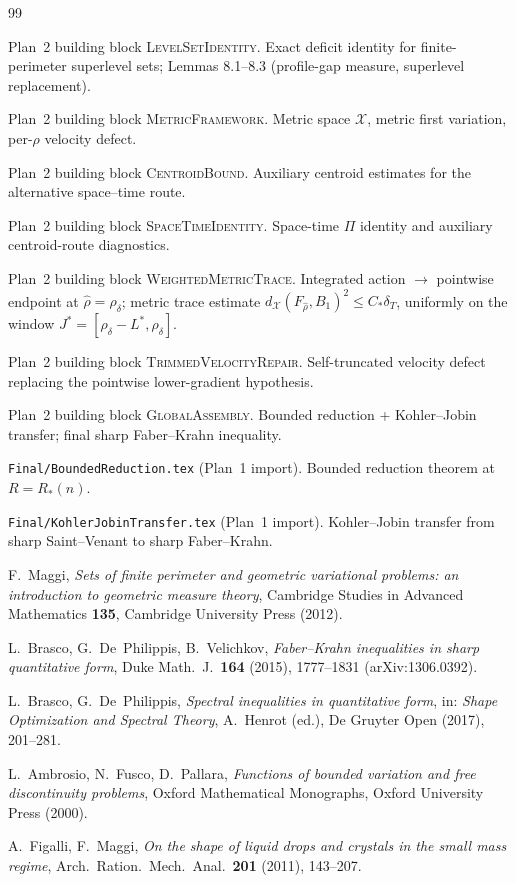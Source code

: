 \documentclass[11pt]{article}
\theoremstyle{definition}
\newcommand{\rhad}{\widehat\rho}
\newcommand{\X}{\mathcal X}
\begin{document}
\begin{thebibliography}{99}

Plan~2 building block \textsc{LevelSetIdentity}.
Exact deficit identity for finite-perimeter superlevel sets;
Lemmas 8.1--8.3 (profile-gap measure, superlevel replacement).

Plan~2 building block \textsc{MetricFramework}.
Metric space $\X$, metric first variation, per-$\rho$ velocity
defect.

Plan~2 building block \textsc{CentroidBound}.
Auxiliary centroid estimates for the alternative space--time route.

Plan~2 building block \textsc{SpaceTimeIdentity}.
Space-time $\Pi$ identity and auxiliary centroid-route diagnostics.

Plan~2 building block \textsc{WeightedMetricTrace}.
Integrated action $\to$ pointwise endpoint at
$\rhad=\rho_\delta$; metric trace estimate
$d_{\X}(F_{\rhad},B_1)^2\le C_*\delta_T$, uniformly on the window
$J^*=[\rho_\delta-L^*,\rho_\delta]$.

Plan~2 building block \textsc{TrimmedVelocityRepair}.
Self-truncated velocity defect replacing the pointwise lower-gradient
hypothesis.

Plan~2 building block \textsc{GlobalAssembly}.
Bounded reduction + Kohler--Jobin transfer; final sharp Faber--Krahn
inequality.

\texttt{Final/BoundedReduction.tex} (Plan~1 import).
Bounded reduction theorem at $R=R_*(n)$.

\texttt{Final/KohlerJobinTransfer.tex} (Plan~1 import).
Kohler--Jobin transfer from sharp Saint--Venant to sharp
Faber--Krahn.

F.~Maggi,
\emph{Sets of finite perimeter and geometric variational problems:
an introduction to geometric measure theory},
Cambridge Studies in Advanced Mathematics \textbf{135},
Cambridge University Press (2012).

L.~Brasco, G.~De~Philippis, B.~Velichkov,
\emph{Faber--Krahn inequalities in sharp quantitative form},
Duke Math.\ J.\ \textbf{164} (2015), 1777--1831 (arXiv:1306.0392).

L.~Brasco, G.~De~Philippis,
\emph{Spectral inequalities in quantitative form},
in: \emph{Shape Optimization and Spectral Theory},
A.~Henrot (ed.), De Gruyter Open (2017), 201--281.

L.~Ambrosio, N.~Fusco, D.~Pallara,
\emph{Functions of bounded variation and free discontinuity problems},
Oxford Mathematical Monographs, Oxford University Press (2000).

A.~Figalli, F.~Maggi,
\emph{On the shape of liquid drops and crystals in the small mass regime},
Arch.\ Ration.\ Mech.\ Anal.\ \textbf{201} (2011), 143--207.

\end{thebibliography}
\end{document}
